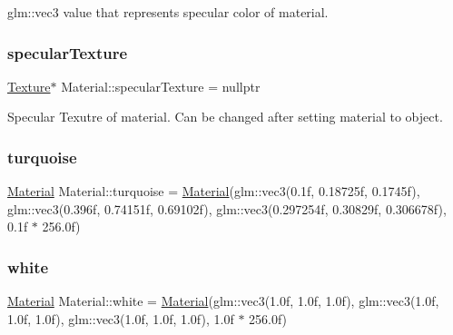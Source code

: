glm\+::vec3 value that represents specular color of material. 

\mbox{\label{struct_material_a1ca33d2644100f269b8289ddd08dd6e4}} 
\subsubsection{\texorpdfstring{specularTexture}{specularTexture}}
{\footnotesize\ttfamily \mbox{\hyperlink{class_texture}{Texture}}$\ast$ Material\+::specular\+Texture = nullptr}



Specular Texutre of material. Can be changed after setting material to object. 

\mbox{\label{struct_material_aa0d30b652e32ae61aa50cedf8ed38656}} 
\subsubsection{\texorpdfstring{turquoise}{turquoise}}
{\footnotesize\ttfamily \mbox{\hyperlink{struct_material}{Material}} Material\+::turquoise = \mbox{\hyperlink{struct_material}{Material}}(glm\+::vec3(0.\+1f, 0.\+18725f, 0.\+1745f), glm\+::vec3(0.\+396f, 0.\+74151f, 0.\+69102f), glm\+::vec3(0.\+297254f, 0.\+30829f, 0.\+306678f), 0.\+1f $\ast$ 256.\+0f)\hspace{0.3cm}{\ttfamily [static]}}

\mbox{\label{struct_material_a0bce3d9c7e1e38fbf55e85a0104c2564}} 
\subsubsection{\texorpdfstring{white}{white}}
{\footnotesize\ttfamily \mbox{\hyperlink{struct_material}{Material}} Material\+::white = \mbox{\hyperlink{struct_material}{Material}}(glm\+::vec3(1.\+0f, 1.\+0f, 1.\+0f), glm\+::vec3(1.\+0f, 1.\+0f, 1.\+0f), glm\+::vec3(1.\+0f, 1.\+0f, 1.\+0f), 1.\+0f $\ast$ 256.\+0f)\hspace{0.3cm}{\ttfamily [static]}}

\mbox{\label{struct_material_ac7c32558480485c95f64558f7732f325}} 

